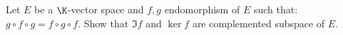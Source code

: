 Let $E$ be a $\K$-vector space and $f, g$ endomorphism of $E$ such that: $g \circ f \circ g = f \circ g \circ f$. Show that $\Im f$ and $\ker f$ are complemented subspace of $E$.